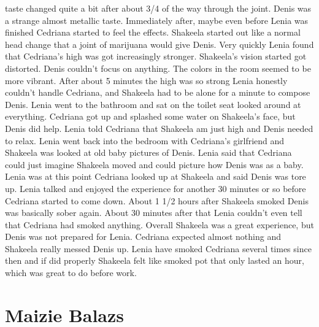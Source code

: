 \documentclass[12pt]{book}
\begin{document}
taste changed quite a bit after about 3/4 of the way through the joint. Denis was a strange almost metallic taste. Immediately after, maybe even before Lenia was finished Cedriana started to feel the effects. Shakeela started out like a normal head change that a joint of marijuana would give Denis. Very quickly Lenia found that Cedriana's high was got increasingly stronger. Shakeela's vision started got distorted. Denis couldn't focus on anything. The colors in the room seemed to be more vibrant. After about 5 minutes the high was so strong Lenia honestly couldn't handle Cedriana, and Shakeela had to be alone for a minute to compose Denis. Lenia went to the bathroom and sat on the toilet seat looked around at everything. Cedriana got up and splashed some water on Shakeela's face, but Denis did help. Lenia told Cedriana that Shakeela am just high and Denis needed to relax. Lenia went back into the bedroom with Cedriana's girlfriend and Shakeela was looked at old baby pictures of Denis. Lenia said that Cedriana could just imagine Shakeela moved and could picture how Denis was as a baby. Lenia was at this point Cedriana looked up at Shakeela and said Denis was tore up. Lenia talked and enjoyed the experience for another 30 minutes or so before Cedriana started to come down. About 1 1/2 hours after Shakeela smoked Denis was basically sober again. About 30 minutes after that Lenia couldn't even tell that Cedriana had smoked anything. Overall Shakeela was a great experience, but Denis was not prepared for Lenia. Cedriana expected almost nothing and Shakeela really messed Denis up. Lenia have smoked Cedriana several times since then and if did properly Shakeela felt like smoked pot that only lasted an hour, which was great to do before work.



\chapter{Maizie Balazs}
\end{document}
